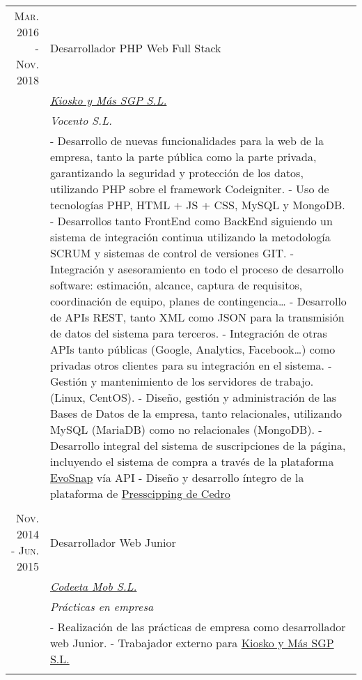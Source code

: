 \documentclass[a4paper,10pt]{article}
\begin{document}
\begin{tabular}{r|p{11cm}}
 	\textsc{Mar. 2016 - Nov. 2018} & 	Desarrollador PHP Web Full Stack \\&
	\emph{\href{https://www.kioskoymas.com}{Kiosko y Más SGP S.L.}}\\&
	\emph{Vocento S.L.}\\&
	\footnotesize{
		- Desarrollo de nuevas funcionalidades para la web de la empresa, tanto la parte pública como la parte privada, garantizando la seguridad y protección de los datos, utilizando PHP sobre el framework Codeigniter.\newline
		- Uso de tecnologías PHP, HTML + JS + CSS, MySQL y MongoDB. \newline
		- Desarrollos tanto FrontEnd como BackEnd siguiendo un sistema de integración continua utilizando la metodología SCRUM y sistemas de control de versiones GIT.\newline
		- Integración y asesoramiento en todo el proceso de desarrollo software: estimación, alcance, captura de requisitos, coordinación de equipo, planes de contingencia… \newline
		- Desarrollo de APIs REST, tanto XML como JSON para la transmisión de datos del sistema para terceros. \newline
		- Integración de otras APIs tanto públicas (Google, Analytics, Facebook…) como privadas otros clientes para su integración en el sistema.\newline
		- Gestión y mantenimiento de los servidores de trabajo. (Linux, CentOS).\newline
		- Diseño, gestión y administración de las Bases de Datos de la empresa, tanto relacionales, utilizando MySQL (MariaDB) como no relacionales (MongoDB).\newline
		- Desarrollo integral del sistema de suscripciones de la página, incluyendo el sistema de compra a través de la plataforma \href{https://www.evosnap.com/}{EvoSnap} vía API\newline
		- Diseño y desarrollo íntegro de la plataforma de \href{http://pressclipping.cedro.org}{Presscipping de Cedro}	
	}
	\\\multicolumn{2}{c}{} \\

 	\textsc{Nov. 2014 - Jun. 2015} & 	Desarrollador Web Junior \\&
	\emph{\href{https://codeeta.com/}{Codeeta Mob S.L.}}\\&
	\emph{Prácticas en empresa}\\&
	\footnotesize{
		- Realización de las prácticas de empresa como desarrollador web Junior.\newline
		- Trabajador externo para \href{https://www.kioskoymas.com}{Kiosko y Más SGP S.L.}
	}
	\\\multicolumn{2}{c}{} \\


\end{tabular}
\end{document}
